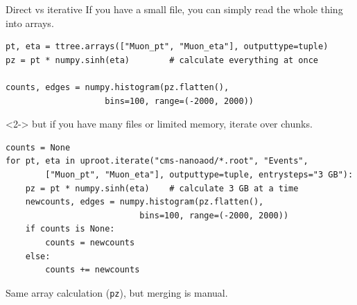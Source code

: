 \documentclass[aspectratio=169]{beamer}
\begin{document}
\begin{frame}[fragile]{Direct vs iterative}
\large
\vspace{0.25 cm}
If you have a small file, you can simply read the whole thing into arrays.

\small
\begin{verbatim}
pt, eta = ttree.arrays(["Muon_pt", "Muon_eta"], outputtype=tuple)
pz = pt * numpy.sinh(eta)        # calculate everything at once

counts, edges = numpy.histogram(pz.flatten(),
                    bins=100, range=(-2000, 2000))
\end{verbatim}

\large
\vspace{-0.1 cm}
\begin{uncoverenv}<2->
but if you have many files or limited memory, iterate over chunks.

\small
\vspace{-0.1 cm}
\begin{verbatim}
counts = None
for pt, eta in uproot.iterate("cms-nanoaod/*.root", "Events",
        ["Muon_pt", "Muon_eta"], outputtype=tuple, entrysteps="3 GB"):
    pz = pt * numpy.sinh(eta)    # calculate 3 GB at a time
    newcounts, edges = numpy.histogram(pz.flatten(),
                           bins=100, range=(-2000, 2000))
    if counts is None:
        counts = newcounts
    else:
        counts += newcounts
\end{verbatim}
\large

\vspace{-1.3 cm}
\hfill \begin{minipage}{0.35\linewidth}
Same array calculation (\texttt{pz}), but merging is manual.
\end{minipage}
\vspace{1.3 cm}
\end{uncoverenv}
\end{frame}
\end{document}

